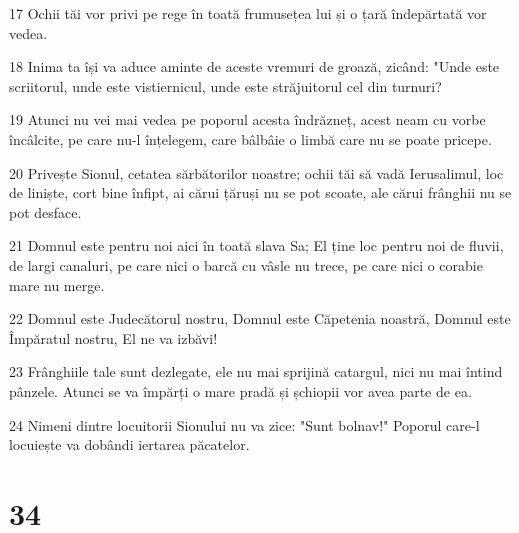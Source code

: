 \par 17 Ochii tăi vor privi pe rege în toată frumusețea lui și o țară îndepărtată vor vedea.
\par 18 Inima ta își va aduce aminte de aceste vremuri de groază, zicând: "Unde este scriitorul, unde este vistiernicul, unde este străjuitorul cel din turnuri?
\par 19 Atunci nu vei mai vedea pe poporul acesta îndrăzneț, acest neam cu vorbe încâlcite, pe care nu-l înțelegem, care bâlbâie o limbă care nu se poate pricepe.
\par 20 Privește Sionul, cetatea sărbătorilor noastre; ochii tăi să vadă Ierusalimul, loc de liniște, cort bine înfipt, ai cărui țăruși nu se pot scoate, ale cărui frânghii nu se pot desface.
\par 21 Domnul este pentru noi aici în toată slava Sa; El ține loc pentru noi de fluvii, de largi canaluri, pe care nici o barcă cu vâsle nu trece, pe care nici o corabie mare nu merge.
\par 22 Domnul este Judecătorul nostru, Domnul este Căpetenia noastră, Domnul este Împăratul nostru, El ne va izbăvi!
\par 23 Frânghiile tale sunt dezlegate, ele nu mai sprijină catargul, nici nu mai întind pânzele. Atunci se va împărți o mare pradă și șchiopii vor avea parte de ea.
\par 24 Nimeni dintre locuitorii Sionului nu va zice: "Sunt bolnav!" Poporul care-l locuiește va dobândi iertarea păcatelor.

\chapter{34}

